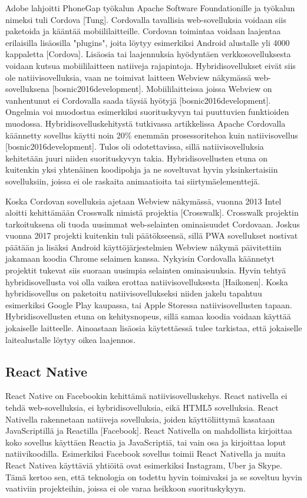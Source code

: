 \documentclass{tktltiki}
\begin{document}
Adobe lahjoitti PhoneGap työkalun Apache Software Foundationille ja työkalun nimeksi tuli Cordova [Tung]. Cordovalla tavallisia web-sovelluksia voidaan siis paketoida ja kääntää mobiililaitteille. Cordovan toimintaa voidaan laajentaa erilaisilla lisäosilla "plugins", joita löytyy esimerkiksi Android alustalle yli 4000 kappaletta [Cordova]. Lisäosia tai laajennuksia hyödyntäen verkkosovelluksesta voidaan kutsua mobiililaitteen natiiveja rajapintoja. Hybridisovellukset eivät siis ole natiivisovelluksia, vaan ne toimivat laitteen Webview näkymässä web-sovelluksena [bosnic2016development]. Mobiililaitteissa joissa Webview on vanhentunut ei Cordovalla saada täysiä hyötyjä [bosnic2016development]. Ongelmia voi muodostua esimerkiksi suorituskyvyn tai puuttuvien funktioiden muodossa. Hybridisovelluskehitystä tutkivassa artikkelissa Apache Cordovalla käännetty sovellus käytti noin 20\% enemmän prosessoritehoa kuin natiivisovellus [bosnic2016development]. Tulos oli odotettavissa, sillä natiivisovelluksia kehitetään juuri niiden suorituskyvyn takia. Hybridisovellusten etuna on kuitenkin yksi yhtenäinen koodipohja ja ne soveltuvat hyvin yksinkertaisiin sovelluksiin, joissa ei ole raskaita animaatioita tai siirtymäelementtejä. 

Koska Cordovan sovelluksia ajetaan Webview näkymässä, vuonna 2013 Intel aloitti kehittämään Crosswalk nimistä projektia [Crosswalk]. Crosswalk projektin tarkoituksena oli tuoda uusimmat web-selainten ominaisuudet Cordovaan. Joskus vuonna 2017 projekti kuitenkin tuli päätökseensä, sillä PWA sovellukset nostivat päätään ja lisäksi Android käyttöjärjestelmien Webview näkymä päivitettiin jakamaan koodia Chrome selaimen kanssa. Nykyisin Cordovalla käännetyt projektit tukevat siis suoraan uusimpia selainten ominaisuuksia. Hyvin tehtyä hybridisovellusta voi olla vaikea erottaa natiivisovelluksesta [Haikonen]. Koska hybridisovellus on paketoitu natiivisovellukseksi niiden jakelu tapahtuu esimerkiksi Google Play kaupassa, tai Apple Storessa natiivisovellusten tapaan. Hybridisovellusten etuna on kehitysnopeus, sillä samaa koodia voidaan käyttää jokaiselle laitteelle. Ainoastaan lisäosia käytettäessä tulee tarkistaa, että jokaiselle laitealustalle löytyy oikea laajennos. 

\subsection{React Native}

React Native on Facebookin kehittämä natiivisovelluskehys. React nativella ei tehdä web-sovelluksia, ei hybridisovelluksia, eikä HTML5 sovelluksia. React Nativella rakennetaan natiiveja sovelluksia, joiden käyttöliittymä kasataan JavaScriptillä ja Reactilla [Facebook]. React Nativella on mahdollista kirjoittaa koko sovellus käyttäen Reactia ja JavaScriptiä, tai vain osa ja kirjoittaa loput natiivikoodilla. Esimerkiksi Facebook sovellus toimii React Nativella ja muita React Nativea käyttäviä yhtiöitä ovat esimerkiksi Instagram, Uber ja Skype. Tämä kertoo sen, että teknologia on todettu hyvin toimivaksi ja se soveltuu hyvin vaativiin projekteihin, joissa ei ole varaa heikkoon suorituskykyyn.
\end{document}
